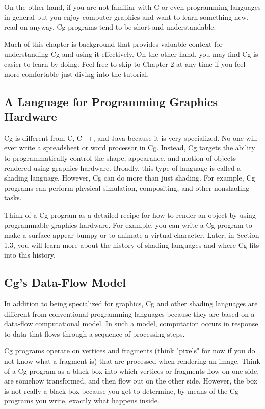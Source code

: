 \documentclass[../main.tex]{subfiles}
\begin{document}
On the other hand, if you are not familiar with C or even programming languages in general but you enjoy computer graphics and want to learn something new, read on anyway. Cg programs tend to be short and understandable.

Much of this chapter is background that provides valuable context for understanding Cg and using it effectively. On the other hand, you may find Cg is easier to learn by doing. Feel free to skip to Chapter 2 at any time if you feel more comfortable just diving into the tutorial.

\subsection{A Language for Programming Graphics Hardware}

Cg is different from C, C++, and Java because it is very specialized. No one will ever write a spreadsheet or word processor in Cg. Instead, Cg targets the ability to programmatically control the shape, appearance, and motion of objects rendered using graphics hardware. Broadly, this type of language is called a shading language. However, Cg can do more than just shading. For example, Cg programs can perform physical simulation, compositing, and other nonshading tasks.

Think of a Cg program as a detailed recipe for how to render an object by using programmable graphics hardware. For example, you can write a Cg program to make a surface appear bumpy or to animate a virtual character. Later, in Section 1.3, you will learn more about the history of shading languages and where Cg fits into this history.

\subsection{Cg's Data-Flow Model}

In addition to being specialized for graphics, Cg and other shading languages are different from conventional programming languages because they are based on a data-flow computational model. In such a model, computation occurs in response to data that flows through a sequence of processing steps.

Cg programs operate on vertices and fragments (think "pixels" for now if you do not know what a fragment is) that are processed when rendering an image. Think of a Cg program as a black box into which vertices or fragments flow on one side, are somehow transformed, and then flow out on the other side. However, the box is not really a black box because you get to determine, by means of the Cg programs you write, exactly what happens inside.
\end{document}
